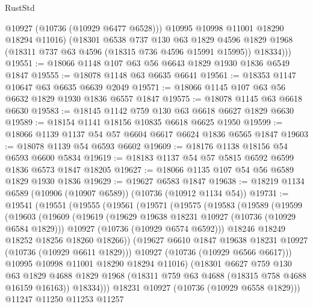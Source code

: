 \begin{lexlean}{RustStd}
\begin{coremodule}
            @10927
            (@10736 (@10929 @6477 @6528)))
          @10995
          @10998
          @11001
          @18290
          @18294
          @11016)
        (@18301
          @6538
          @737
          @130
          @63
          @1829
          @4596
          @1829
          @1968
          (@18311 @737 @63 @4596 (@18315 @736 @4596 @15991 @15995))
          @18334)))
@19551 := @18066 @1148 @107 @63 @56 @6643 @1829 @1930 @1836 @6549 @1847
@19555 := @18078 @1148 @63 @6635 @6641
@19561 := @18353 @1147 @10647 @63 @6635 @6639 @2049
@19571 := @18066 @1145 @107 @63 @56 @6632 @1829 @1930 @1836 @6557 @1847
@19575 := @18078 @1145 @63 @6618 @6630
@19583 := @18145 @1142 @759 @130 @63 @6618 @6627 @1829 @6630
@19589 := @18154 @1141 @18156 @10835 @6618 @6625 @1950
@19599 := @18066 @1139 @1137 @54 @57 @6604 @6617 @6624 @1836 @6565 @1847
@19603 := @18078 @1139 @54 @6593 @6602
@19609 := @18176 @1138 @18156 @54 @6593 @6600 @5834
@19619 := @18183 @1137 @54 @57 @5815 @6592 @6599 @1836 @6573 @1847 @18205
@19627 := @18066 @1135 @107 @54 @56 @6589 @1829 @1930 @1836
@19629 := @19627 @6583 @1847
@19638 := @18219 @1134 @6589 (@10906 (@10907 @6589)) (@10736 (@10912 @1134 @54))
@19731 := @19541
    (@19551
      (@19555
        (@19561
          (@19571
            (@19575
              (@19583
                (@19589
                  (@19599
                    (@19603
                      (@19609
                        (@19619
                          (@19629 @19638 @18231 @10927 (@10736 (@10929 @6584 @1829)))
                          @10927
                          (@10736 (@10929 @6574 @6592)))
                        @18246
                        @18249
                        @18252
                        @18256
                        @18260
                        @18266))
                    (@19627 @6610 @1847 @19638 @18231 @10927 (@10736 (@10929 @6611 @1829)))
                    @10927
                    (@10736 (@10929 @6566 @6617)))
                  @10995
                  @10998
                  @11001
                  @18290
                  @18294
                  @11016)
                (@18301
                  @6627
                  @759
                  @130
                  @63
                  @1829
                  @4688
                  @1829
                  @1968
                  (@18311 @759 @63 @4688 (@18315 @758 @4688 @16159 @16163))
                  @18334)))
            @18231
            @10927
            (@10736 (@10929 @6558 @1829)))
          @11247
          @11250
          @11253
          @11257

\end{coremodule}
\end{lexlean}
